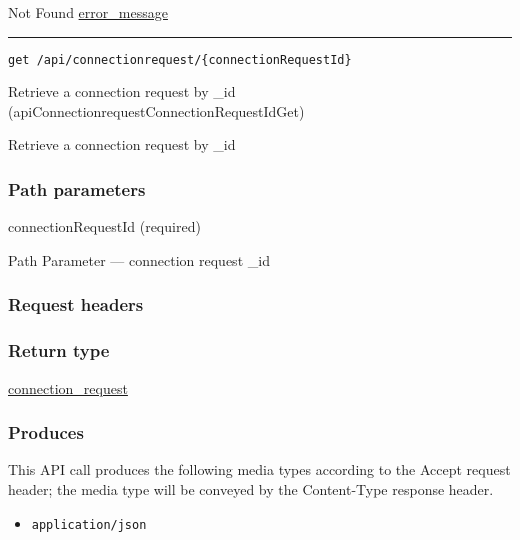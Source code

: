 Not Found \protect\hyperlink{error_message}{error\_message}

\begin{center}\rule{0.5\linewidth}{\linethickness}\end{center}

\protect\hypertarget{apiConnectionrequestConnectionRequestIdGet}{}{}

\begin{verbatim}
get /api/connectionrequest/{connectionRequestId}
\end{verbatim}

Retrieve a connection request by \_id
({apiConnectionrequestConnectionRequestIdGet})

Retrieve a connection request by \_id

\hypertarget{path-parameters-60}{%
\subsubsection{Path parameters}\label{path-parameters-60}}

connectionRequestId (required)

{Path Parameter} --- connection request \_id

\hypertarget{request-headers-63}{%
\subsubsection{Request headers}\label{request-headers-63}}

\hypertarget{return-type-85}{%
\subsubsection{Return type}\label{return-type-85}}

\protect\hyperlink{connection_request}{connection\_request}

\hypertarget{produces-110}{%
\subsubsection{Produces}\label{produces-110}}

This API call produces the following media types according to the
{Accept} request header; the media type will be conveyed by the
{Content-Type} response header.

\begin{itemize}
\tightlist
\item
  \texttt{application/json}
\end{itemize}

